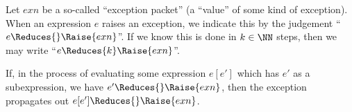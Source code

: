 \begin{node}\label{sml-000F}%
Let $exn$ be a so-called ``exception packet'' (a ``value'' of some kind
of exception). When an expression $e$ raises an exception, we indicate
this by the judgement ``$e\Reduces{}\Raise{exn}$''. If we know this is done
in $k\in\NN$ steps, then we may write ``$e\Reduces{k}\Raise{exn}$''.

If, in the process of evaluating some expression $e[e']$ which has $e'$
as a subexpression, we have $e'\Reduces{}\Raise{exn}$, then
the exception propagates out $e[e']\Reduces{}\Raise{exn}$.
\end{node}
